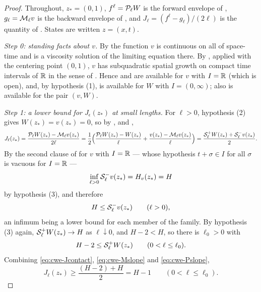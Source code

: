 \begin{proof}
Throughout, $z_*=(0,1)$, $f^\ell=\mathcal{P}_\ell W$ is the forward envelope of
, $g_\ell=\mathcal{M}_\ell v$ is the backward envelope of
, and $J_\ell=(f^\ell-g_\ell)/(2\ell)$ is the quantity of
. States are written $z=(x,t)$.

\emph{Step 0: standing facts about $v$.}
By  the function $v$ is continuous on all of space-time and
is a viscosity solution of the limiting equation there. By
, applied with the centering point $(0,1)$, $v$ has
subquadratic spatial growth on compact time intervals of $\mathbb{R}$ in the sense of
. Hence  and
 are available for $v$ with $I=\mathbb{R}$ (which is
open), and, by hypothesis (1),  is available for $W$
with $I=(0,\infty)$; also  is available for the
pair $(v,W)$.

\emph{Step 1: a lower bound for $J_\epsilon(z_*)$ at small lengths.}
For $\ell>0$, hypothesis (2) gives $W(z_*)=v(z_*)=0$, so by
,  and ,
\begin{equation}\label{eq:cwe-Jcontact}
  J_\ell(z_*)=\frac{\mathcal{P}_\ell W(z_*)-\mathcal{M}_\ell v(z_*)}{2\ell}
   =\frac12\Bigl(\frac{\mathcal{P}_\ell W(z_*)-W(z_*)}{\ell}
        +\frac{v(z_*)-\mathcal{M}_\ell v(z_*)}{\ell}\Bigr)
   =\frac{\mathcal{S}^+_\ell W(z_*)+\mathcal{S}^-_\ell v(z_*)}{2}.
\end{equation}
By the second clause of  for $v$ with $I=\mathbb{R}$ ---
whose hypothesis $t+\sigma\in I$ for all $\sigma$ is vacuous for $I=\mathbb{R}$ ---
\[
  \inf_{\ell>0}\mathcal{S}^-_\ell v(z_*)=H_v(z_*)=H
\]
by hypothesis (3), and therefore
\begin{equation}\label{eq:cwe-Mslope}
  H\le\mathcal{S}^-_\ell v(z_*)\qquad(\ell>0),
\end{equation}
an infimum being a lower bound for each member of the family. By hypothesis (3)
again, $\mathcal{S}^+_\ell W(z_*)\to H$ as $\ell\downarrow0$, and $H-2<H$, so there is
$\ell_0>0$ with
\begin{equation}\label{eq:cwe-Pslope}
  H-2\le\mathcal{S}^+_\ell W(z_*)\qquad(0<\ell\le\ell_0).
\end{equation}
Combining \eqref{eq:cwe-Jcontact}, \eqref{eq:cwe-Mslope} and
\eqref{eq:cwe-Pslope},
\begin{equation}\label{eq:cwe-Jlow}
  J_\ell(z_*)\ge\frac{(H-2)+H}{2}=H-1\qquad(0<\ell\le\ell_0).
\end{equation}


\end{proof}
